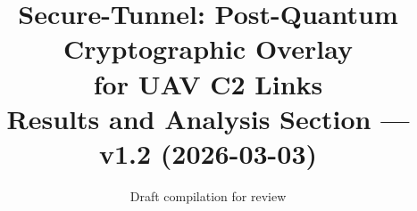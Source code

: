 \documentclass[conference,10pt]{IEEEtran}
\begin{document}
\title{Secure-Tunnel: Post-Quantum Cryptographic Overlay\\for UAV C2 Links\\
{\normalsize Results and Analysis Section --- v1.2 (2026-03-03)}}
\author{Draft compilation for review}
\maketitle


\end{document}
